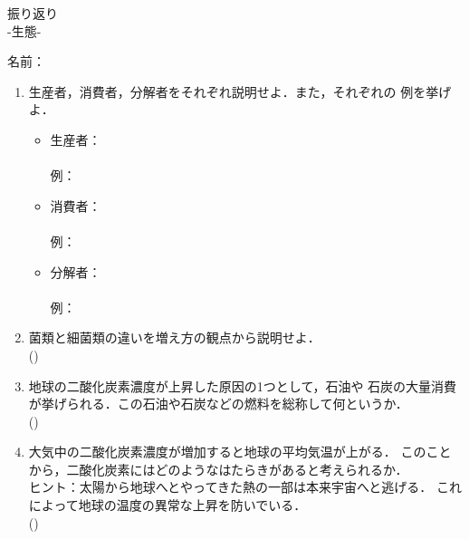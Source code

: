 \documentclass[fontsize=15pt]{jlreq}
\newcommand{\m}[1]{\raisebox{0.1em}{\textcircled{\scriptsize #1}}}
\begin{document}
\begin{center}
{\LARGE {振り返り}} \\
-生態\m{2}- %
\end{center}
\vspace{1em}
\begin{flushright}
名前：\underline{\hspace{5cm}}
\end{flushright}

\begin{enumerate}
  \item 生産者，消費者，分解者をそれぞれ説明せよ．また，それぞれの
  例を挙げよ．
  \begin{itemize}
    \item 生産者：\\\\
    \hspace{1.05cm}例： 
    \item 消費者：\\\\
    \hspace{1.05cm}例： 
    \item 分解者：\\\\
    \hspace{1.05cm}例： 
  \end{itemize}

  \vspace{2em}
  
  \item 菌類と細菌類の違いを増え方の観点から説明せよ．\\
  (\hspace{17cm})

  \vspace{2em}

  \item 地球の二酸化炭素濃度が上昇した原因の1つとして，石油や
  石炭の大量消費が挙げられる．この石油や石炭などの燃料を総称して何というか．\\
  (\hspace{3cm})

  \vspace{2em}

  \item 大気中の二酸化炭素濃度が増加すると地球の平均気温が上がる．
  このことから，二酸化炭素にはどのようなはたらきがあると考えられるか．\\
  \small\small ヒント：太陽から地球へとやってきた熱の一部は本来宇宙へと逃げる．
  これによって地球の温度の異常な上昇を防いでいる．\normalsize\\
  (\hspace{17cm})
\end{enumerate}
\end{document}
